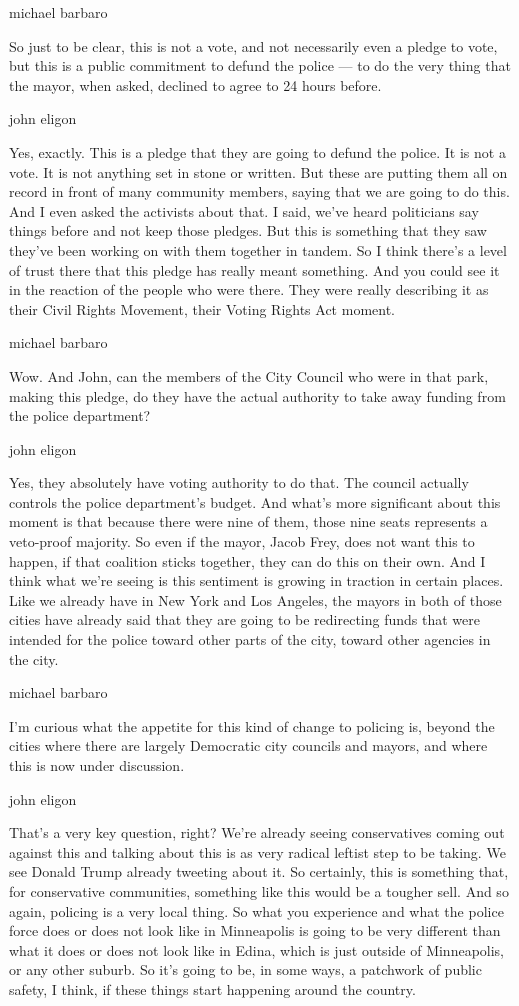 michael barbaro

So just to be clear, this is not a vote, and not necessarily even a
pledge to vote, but this is a public commitment to defund the police ---
to do the very thing that the mayor, when asked, declined to agree to 24
hours before.

john eligon

Yes, exactly. This is a pledge that they are going to defund the police.
It is not a vote. It is not anything set in stone or written. But these
are putting them all on record in front of many community members,
saying that we are going to do this. And I even asked the activists
about that. I said, we've heard politicians say things before and not
keep those pledges. But this is something that they saw they've been
working on with them together in tandem. So I think there's a level of
trust there that this pledge has really meant something. And you could
see it in the reaction of the people who were there. They were really
describing it as their Civil Rights Movement, their Voting Rights Act
moment.

michael barbaro

Wow. And John, can the members of the City Council who were in that
park, making this pledge, do they have the actual authority to take away
funding from the police department?

john eligon

Yes, they absolutely have voting authority to do that. The council
actually controls the police department's budget. And what's more
significant about this moment is that because there were nine of them,
those nine seats represents a veto-proof majority. So even if the mayor,
Jacob Frey, does not want this to happen, if that coalition sticks
together, they can do this on their own. And I think what we're seeing
is this sentiment is growing in traction in certain places. Like we
already have in New York and Los Angeles, the mayors in both of those
cities have already said that they are going to be redirecting funds
that were intended for the police toward other parts of the city, toward
other agencies in the city.

michael barbaro

I'm curious what the appetite for this kind of change to policing is,
beyond the cities where there are largely Democratic city councils and
mayors, and where this is now under discussion.

john eligon

That's a very key question, right? We're already seeing conservatives
coming out against this and talking about this is as very radical
leftist step to be taking. We see Donald Trump already tweeting about
it. So certainly, this is something that, for conservative communities,
something like this would be a tougher sell. And so again, policing is a
very local thing. So what you experience and what the police force does
or does not look like in Minneapolis is going to be very different than
what it does or does not look like in Edina, which is just outside of
Minneapolis, or any other suburb. So it's going to be, in some ways, a
patchwork of public safety, I think, if these things start happening
around the country.

